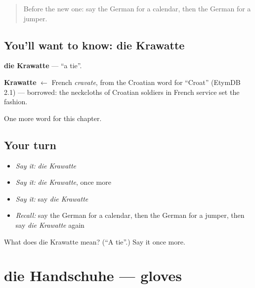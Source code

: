 \label{lesson:GE-C118-krawatte}



\begin{quote}
Before the new one: say the German for a calendar, then the German for a jumper.
\end{quote}

\subsection*{You'll want to know: die Krawatte}
\textbf{die Krawatte} — \textquotedblleft{}a tie\textquotedblright{}.

\begin{cousinweb}
\textbf{Krawatte} $\leftarrow$ French \emph{cravate}, from the Croatian word for \textquotedblleft{}Croat\textquotedblright{} (EtymDB 2.1) — borrowed: the neckcloths of Croatian soldiers in French service set the fashion.
\end{cousinweb}

\begin{grammarlens}[title={What you've built}]
One more word for this chapter.
\end{grammarlens}

\subsection*{Your turn}
\begin{itemize}
\raggedright
  \item \emph{Say it:} \emph{die Krawatte}
  \item \emph{Say it:} \emph{die Krawatte}, once more
  \item \emph{Say it:} say \emph{die Krawatte}
  \item \emph{Recall:} say the German for a calendar, then the German for a jumper, then say \emph{die Krawatte} again
\end{itemize}

\begin{tcolorbox}[breakable,colback=teal!4,colframe=teal!35!black,title={Before you move on}]
What does die Krawatte mean? (\textquotedblleft{}A tie\textquotedblright{}.) Say it once more.
\end{tcolorbox}
\section[die Handschuhe]{die Handschuhe — gloves}

\label{lesson:GE-C118-handschuhe}



